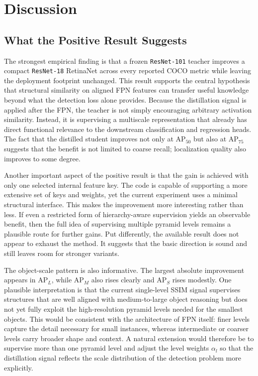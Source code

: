 \section{Discussion}

\subsection{What the Positive Result Suggests}

The strongest empirical finding is that a frozen \texttt{ResNet-101} teacher improves a compact \texttt{ResNet-18} RetinaNet across every reported COCO metric while leaving the deployment footprint unchanged. This result supports the central hypothesis that structural similarity on aligned FPN features can transfer useful knowledge beyond what the detection loss alone provides. Because the distillation signal is applied after the FPN, the teacher is not simply encouraging arbitrary activation similarity. Instead, it is supervising a multiscale representation that already has direct functional relevance to the downstream classification and regression heads. The fact that the distilled student improves not only at AP$_{50}$ but also at AP$_{75}$ suggests that the benefit is not limited to coarse recall; localization quality also improves to some degree.

Another important aspect of the positive result is that the gain is achieved with only one selected internal feature key. The code is capable of supporting a more extensive set of keys and weights, yet the current experiment uses a minimal structural interface. This makes the improvement more interesting rather than less. If even a restricted form of hierarchy-aware supervision yields an observable benefit, then the full idea of supervising multiple pyramid levels remains a plausible route for further gains. Put differently, the available result does not appear to exhaust the method. It suggests that the basic direction is sound and still leaves room for stronger variants.

The object-scale pattern is also informative. The largest absolute improvement appears in AP$_L$, while AP$_M$ also rises clearly and AP$_S$ rises modestly. One plausible interpretation is that the current single-level SSIM signal supervises structures that are well aligned with medium-to-large object reasoning but does not yet fully exploit the high-resolution pyramid levels needed for the smallest objects. This would be consistent with the architecture of FPN itself: finer levels capture the detail necessary for small instances, whereas intermediate or coarser levels carry broader shape and context. A natural extension would therefore be to supervise more than one pyramid level and adjust the level weights $\alpha_l$ so that the distillation signal reflects the scale distribution of the detection problem more explicitly.

